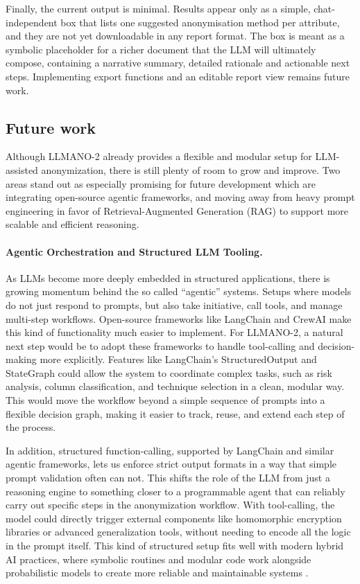 \documentclass{article}
\begin{document}
Finally, the current output is minimal.  Results appear only as a simple, chat-independent box that lists one suggested anonymisation method per attribute, and they are not yet downloadable in any report format.  The box is meant as a symbolic placeholder for a richer document that the LLM will ultimately compose, containing a narrative summary, detailed rationale and actionable next steps.  Implementing export functions and an editable report view remains future work.

\subsection{Future work}

Although LLMANO-2 already provides a flexible and modular setup for LLM-assisted anonymization, there is still plenty of room to grow and improve. Two areas stand out as especially promising for future development which are integrating open-source agentic frameworks, and moving away from heavy prompt engineering in favor of Retrieval-Augmented Generation (RAG) to support more scalable and efficient reasoning.

\paragraph{Agentic Orchestration and Structured LLM Tooling.}
As LLMs become more deeply embedded in structured applications, there is growing momentum behind the so called “agentic” systems. Setups where models do not just respond to prompts, but also take initiative, call tools, and manage multi-step workflows. Open-source frameworks like LangChain and CrewAI make this kind of functionality much easier to implement. For LLMANO-2, a natural next step would be to adopt these frameworks to handle tool-calling and decision-making more explicitly. Features like LangChain’s StructuredOutput and StateGraph could allow the system to coordinate complex tasks, such as risk analysis, column classification, and technique selection in a clean, modular way. This would move the workflow beyond a simple sequence of prompts into a flexible decision graph, making it easier to track, reuse, and extend each step of the process.

In addition, structured function-calling, supported by LangChain and similar agentic frameworks, lets us enforce strict output formats in a way that simple prompt validation often can not. This shifts the role of the LLM from just a reasoning engine to something closer to a programmable agent that can reliably carry out specific steps in the anonymization workflow. With tool-calling, the model could directly trigger external components like homomorphic encryption libraries or advanced generalization tools, without needing to encode all the logic in the prompt itself. This kind of structured setup fits well with modern hybrid AI practices, where symbolic routines and modular code work alongside probabilistic models to create more reliable and maintainable systems \cite{jarvix}.
\end{document}
